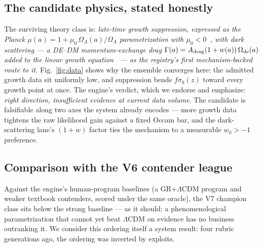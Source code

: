 \documentclass[journal]{IEEEtran}
\newcommand{\fsig}{f\sigma_8}
\begin{document}
\subsection{The candidate physics, stated honestly}
The surviving theory class is: \emph{late-time growth suppression, expressed as the
Planck $\mu(a) = 1 + \mu_0\,\Omega_\Lambda(a)/\Omega_\Lambda$ parametrization with
$\mu_0 < 0$~\cite{planckmg2015}, with dark scattering --- a DE--DM momentum-exchange drag
$\Gamma(a) = A_{\rm drag}(1+w(a))\,\Omega_{\rm de}(a)$ added to the linear growth
equation~\cite{simpson2010,pourtsidou2013} --- as the registry's first mechanism-backed
route to it.} Fig.~\ref{fig:data} shows why the ensemble converges here: the admitted
growth data sit uniformly low, and suppression bends $\fsig(z)$ toward every growth
point at once. The engine's verdict, which we endorse and emphasize: \emph{right
direction, insufficient evidence at current data volume}. The candidate is falsifiable
along two axes the system already encodes --- more growth data tightens the raw
likelihood gain against a fixed Occam bar, and the dark-scattering lane's $(1+w)$ factor
ties the mechanism to a measurable $w_0 > -1$ preference.

\subsection{Comparison with the V6 contender league}
Against the engine's human-program baselines (a GR$+\Lambda$CDM program and weaker
textbook contenders, scored under the same oracle), the V7 champion class sits below
the strong baseline --- as it should: a phenomenological parametrization that cannot yet
beat $\Lambda$CDM on evidence has no business outranking it. We consider this ordering
itself a system result: four rubric generations ago, the ordering was inverted by
exploits.
\end{document}
